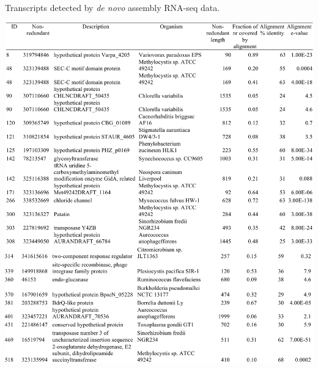 \begin{table}[H]
\caption{Transcripts detected by \textit{de novo} assembly RNA-seq data.}
\label{table:ChA_S1}
\includegraphics[width=1.0\textwidth]{./tex/chapter1/figures/supplemental/TableS1a.pdf}
\end{table}

